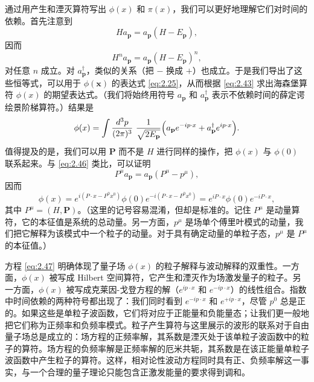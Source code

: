 通过用产生和湮灭算符写出 $\phi(x)$ 和 $\pi(x)$，我们可以更好地理解它们对时间的依赖。首先注意到
\begin{equation}
  Ha_{\mathbf{p}} = a_{\mathbf{p}}(H - E_{\mathbf{p}}),
  \label{eq:2.46}
\end{equation}
因而
\begin{equation}
  H^n a_{\mathbf{p}} = a_{\mathbf{p}}(H - E_{\mathbf{p}})^n,
\end{equation}
对任意 $n$ 成立。对 $a_{\mathbf{p}}^\dagger$，类似的关系（把 $-$ 换成 $+$）也成立。于是我们导出了这些恒等式，可以用于 $\phi(\mathbf{x})$ 的表达式 \eqref{eq:2.25}，从而根据 \eqref{eq:2.43} 求出海森堡算符 $\phi(x)$ 的期望表达式。（我们将始终用符号 $a_{\mathbf{p}}$ 和 $a_{\mathbf{p}}^\dagger$ 表示不依赖时间的薛定谔绘景阶梯算符。）结果是
\begin{equation}
  \phi(x) = \int \frac{d^3p}{(2\pi)^3}\ \frac{1}{\sqrt{2E_{\mathbf{p}}}}
    \Bigl( a_{\mathbf{p}}e^{-ip\cdot x}
      + a_{\mathbf{p}}^\dagger e^{ip\cdot x} \Bigr).
  \label{eq:2.47}
\end{equation}
值得提及的是，我们可以用 $\mathbf{P}$ 而不是 $H$ 进行同样的操作，把 $\phi(x)$ 与 $\phi(0)$ 联系起来。与 \eqref{eq:2.46} 类比，可以证明
\begin{equation}
  P^\mu a_{\mathbf{p}} = a_{\mathbf{p}}(P^\mu - p^\mu),
  \label{eq:2.48}
\end{equation}
因而
\begin{equation}
  \phi(x) = e^{i(P\cdot x - P^0 x^0)}\phi(0)e^{-i(P\cdot x - P^0x^0)}
  = e^{iP\cdot x}\phi(0)e^{-iP\cdot x},
  \label{eq:2.49}
\end{equation}
其中 $P^\mu = (H, \mathbf{P})$。（这里的记号容易混淆，但却是标准的。记住 $P^\mu$ 是动量算符，它的本征值是系统的总动量。另一方面，$p^\mu$ 是场单个傅里叶模式的动量，我们把它解释为该模式中一个粒子的动量。对于具有确定动量的单粒子态，$p^\mu$ 是 $P^\mu$ 的本征值。）

方程 \eqref{eq:2.47} 明确体现了量子场 $\phi(x)$ 的粒子解释与波动解释的双重性。一方面，$\phi(x)$ 被写成 Hilbert 空间算符，它产生和湮灭作为场激发量子的粒子。另一方面，$\phi(x)$ 被写成克莱因-戈登方程的解（$e^{ip\cdot x}$ 和 $e^{-ip\cdot x}$）的线性组合。指数中时间依赖的两种符号都出现了：我们同时看到 $e^{-ip\cdot x}$ 和 $e^{+ip\cdot x}$，尽管 $p^0$ 总是正的。如果这些是单粒子波函数，它们将对应于正能量和负能量态；让我们更一般地把它们称为正频率和负频率模式。粒子产生算符与这里展示的波形的联系对于自由量子场总是成立的：场方程的正频率解，其系数是湮灭处于该单粒子波函数中的粒子的算符。场方程的负频率解是正频率解的厄米共轭，其系数是在该正能量单粒子波函数中产生粒子的算符。这样，相对论性波动方程同时具有正、负频率解这一事实，与一个合理的量子理论只能包含正激发能量的要求得到调和。

